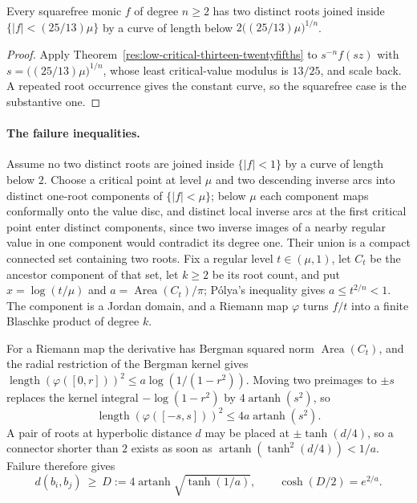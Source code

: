\begin{corollary}
\label{res:low-critical-scale-free}
Every squarefree monic $f$ of degree $n\ge2$ has two distinct roots joined
inside $\{|f|<(25/13)\mu\}$ by a curve of length below
$2\bigl((25/13)\mu\bigr)^{1/n}$.
\end{corollary}

\begin{proof}
Apply Theorem~\ref{res:low-critical-thirteen-twentyfifths} to
$s^{-n}f(sz)$ with $s=\bigl((25/13)\mu\bigr)^{1/n}$, whose least
critical-value modulus is $13/25$, and scale back.  A repeated root occurrence
gives the constant curve, so the squarefree case is the substantive one.
\end{proof}

\paragraph{The failure inequalities.}
Assume no two distinct roots are joined inside $\{|f|<1\}$ by a curve of
length below $2$.  Choose a critical point at level $\mu$ and two descending
inverse arcs into distinct one-root components of $\{|f|<\mu\}$; below $\mu$
each component maps conformally onto the value disc, and distinct local
inverse arcs at the first critical point enter distinct components, since two
inverse images of a nearby regular value in one component would contradict its
degree one.  Their union is a compact connected set containing two roots.
Fix a regular level $t\in(\mu,1)$, let $C_t$ be the ancestor component of that
set, let $k\ge2$ be its root count, and put $x=\log(t/\mu)$ and
$a=\operatorname{Area}(C_t)/\pi$; P\'olya's inequality gives $a\le t^{2/n}<1$.
The component is a Jordan domain, and a Riemann map $\varphi$ turns $f/t$ into
a finite Blaschke product of degree $k$.

For a Riemann map the derivative has Bergman squared norm
$\operatorname{Area}(C_t)$, and the radial restriction of the Bergman kernel
gives $\operatorname{length}(\varphi([0,r]))^2\le a\log(1/(1-r^2))$.  Moving
two preimages to $\pm s$ replaces the kernel integral $-\log(1-r^2)$ by
$4\operatorname{artanh}(s^2)$, so
\[
 \operatorname{length}(\varphi([-s,s]))^2\le4a\operatorname{artanh}(s^2).
\]
A pair of roots at hyperbolic distance $d$ may be placed at $\pm\tanh(d/4)$,
so a connector shorter than $2$ exists as soon as
$\operatorname{artanh}(\tanh^2(d/4))<1/a$.  Failure therefore gives
\begin{equation}\label{eq:lc-separation}
 d(b_i,b_j)\ \ge\ D:=4\operatorname{artanh}\sqrt{\tanh(1/a)},
 \qquad \cosh(D/2)=e^{2/a}.
\end{equation}

